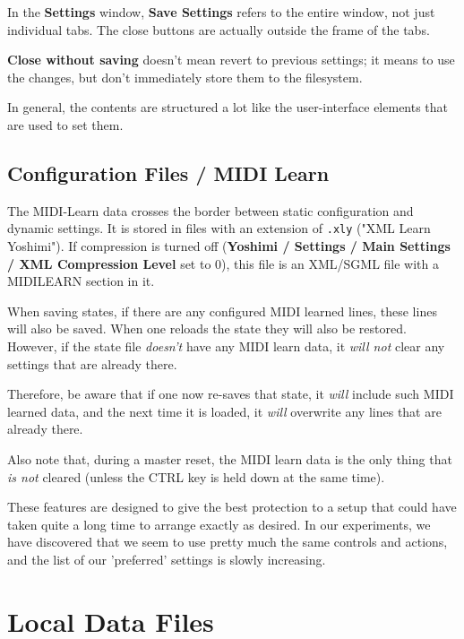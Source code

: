    In the \textbf{Settings} window, \textbf{Save Settings}
   refers to the entire window, not just individual tabs. The close buttons are
   actually outside the frame of the tabs.

   \textbf{Close without saving} doesn't mean revert to previous settings; it
   means to use the changes, but don't immediately store them to the
   filesystem.

   In general, the contents are structured a lot like the
   user-interface elements that are used to set them.

\subsection{Configuration Files / MIDI Learn}
\label{subsec:configuration_file_midi_learn}

   The MIDI-Learn data crosses the border between static configuration and
   dynamic settings. It is stored in files with an extension of
   \texttt{.xly} ("XML Learn Yoshimi").
   If compression is turned off
   (\textbf{Yoshimi / Settings / Main Settings / XML Compression Level} set to
   0), this file is an XML/SGML file with a MIDILEARN section in it.

   When saving states, if there are any configured MIDI learned lines,
   these lines will also be saved.
   When one reloads the state they will also be restored.
   However, if the state file \textsl{doesn't} have any MIDI learn data,
   it \textsl{will not} clear any settings that are already there.

   Therefore, be aware that if one now re-saves that state, it \textsl{will}
   include such MIDI learned data, and the next time it is loaded,
   it \textsl{will} overwrite any lines that are already there.

   Also note that, during a master reset, the MIDI learn data is the only thing
   that \textsl{is not} cleared (unless the CTRL key is held down at the same
   time).

   These features are designed to give the best protection to a setup
   that could have taken quite a long time to arrange exactly as desired.
   In our experiments, we have discovered that we seem to use pretty much the
   same controls and actions, and the list of our 'preferred' settings is
   slowly increasing.

\section{Local Data Files}
\label{sec:local_data}

